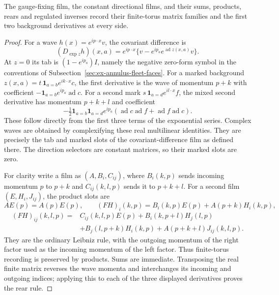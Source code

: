 \begin{lemma}
\label{lem:annulus-fixed-film-tickets}
The gauge-fixing film, the constant directional films, and their sums,
products, rears and regulated inverses record their finite-torus matrix
families and the first two background derivatives at every side.
\end{lemma}
\begin{proof}
For a wave $h(x)=e^{ip\cdot x}v$, the covariant difference is
\[
 (D_{\exp z}h)(x,a)=e^{ip\cdot x}
       \{v-e^{ip_a}e^{\operatorname{ad}z(x,a)}v\}.
\]
At $z=0$ its tab is $(1-e^{ip_a})I$, namely the negative zero-form
symbol in the conventions of Subsection~\ref{sec:ex-annulus-fleet-faces}.
For a marked background $z(x,a)=t\,\mathbf1_{a=b}e^{ik\cdot x}c$,
the first derivative is the wave of momentum $p+k$ with coefficient
$-\mathbf1_{a=b}e^{ip_a}\operatorname{ad}c$. For a second mark
$s\,\mathbf1_{a=d}e^{il\cdot x}f$, the mixed second derivative has
momentum $p+k+l$ and coefficient
\[
 -\tfrac12\mathbf1_{a=b}\mathbf1_{a=d}e^{ip_a}
   (\operatorname{ad}c\operatorname{ad}f+
    \operatorname{ad}f\operatorname{ad}c).
\]
These follow directly from the first three terms of the exponential
series. Complex waves are obtained by complexifying these real
multilinear identities. They are precisely the tab and marked slots
of the covariant-difference film as defined there. The direction
selectors are constant matrices, so their marked slots are zero.

For clarity write a film as $(A,B_i,C_{ij})$, where $B_i(k,p)$ sends
incoming momentum $p$ to $p+k$ and $C_{ij}(k,l,p)$ sends it to $p+k+l$.
For a second film $(E,H_i,J_{ij})$, the product slots are
\[
 AE(p)=A(p)E(p),\qquad
 (FH)_i(k,p)=B_i(k,p)E(p)+A(p+k)H_i(k,p),
\]
\begin{align*}
 (FH)_{ij}(k,l,p)={}&C_{ij}(k,l,p)E(p)
  +B_i(k,p+l)H_j(l,p)\\
 &+B_j(l,p+k)H_i(k,p)+A(p+k+l)J_{ij}(k,l,p).
\end{align*}
They are the ordinary Leibniz rule, with the outgoing momentum of the
right factor used as the incoming momentum of the left factor. Thus
finite-torus recording is preserved by products. Sums are immediate.
Transposing the real finite matrix reverses the wave momenta and
interchanges its incoming and outgoing indices; applying this to each
of the three displayed derivatives proves the rear rule.


\end{proof}
